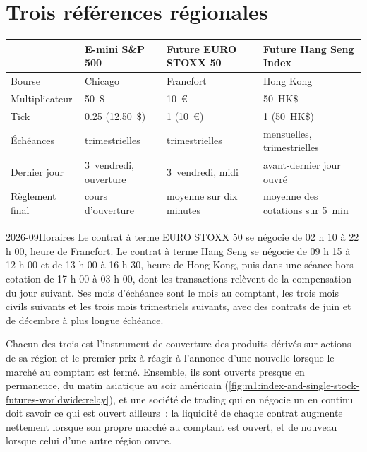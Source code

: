 \section{Trois références régionales}

\begin{center}
\small
\begin{tabular}{llll}
\toprule
 & E-mini S\&P 500 & Future EURO STOXX 50 & Future Hang Seng Index \\
\midrule
Bourse & Chicago & Francfort & Hong Kong \\
Multiplicateur & 50~\$ & 10~\euro & 50~HK\$ \\
Tick & 0.25 (12.50~\$) & 1 (10~\euro) & 1 (50~HK\$) \\
Échéances & trimestrielles & trimestrielles & mensuelles, trimestrielles \\
Dernier jour & 3\up{e}~vendredi, ouverture & 3\up{e}~vendredi, midi & avant-dernier jour ouvré \\
Règlement final & cours d'ouverture & moyenne sur dix minutes & moyenne des cotations sur 5~min \\
\bottomrule
\end{tabular}
\end{center}

\begin{dated}{2026-09}{Horaires}\label{dat:m1:index-and-single-stock-futures-worldwide:hours}
Le contrat à terme EURO STOXX 50 se négocie de 02 h 10 à 22 h 00, heure de Francfort. Le
contrat à terme Hang Seng se négocie de 09 h 15 à 12 h 00 et de 13 h 00 à 16 h 30,
heure de Hong Kong, puis dans une séance hors cotation de 17 h 00 à 03 h 00, dont
les transactions relèvent de la compensation du jour suivant. Ses mois d'échéance
sont le mois au comptant, les trois mois civils suivants et les trois mois trimestriels
suivants, avec des contrats de juin et de décembre à plus longue échéance.
\end{dated}

Chacun des trois est l'instrument de couverture des produits dérivés sur actions
de sa région et le premier prix à réagir à l'annonce d'une nouvelle lorsque le
marché au comptant est fermé. Ensemble, ils sont ouverts presque en permanence, du matin
asiatique au soir américain (\cref{fig:m1:index-and-single-stock-futures-worldwide:relay}), et une société de trading qui en
négocie un en continu doit savoir ce qui est ouvert ailleurs~: la liquidité de chaque
contrat augmente nettement lorsque son propre marché au comptant est ouvert, et de
nouveau lorsque celui d'une autre région ouvre.

